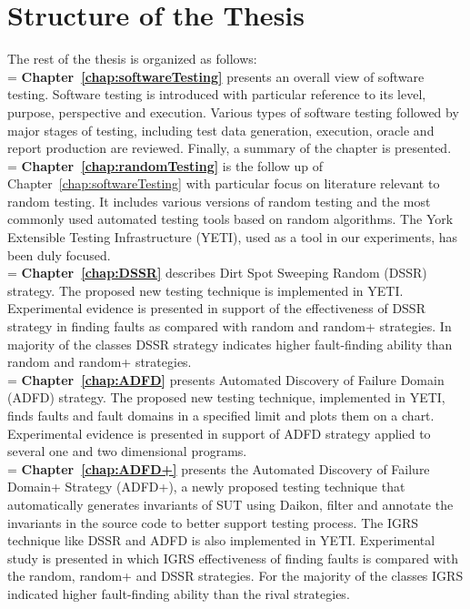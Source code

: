 \section{Structure of the Thesis}
The rest of the thesis is organized as follows:\\

\hangindent=\parindent
{}
\noindent
\textbf{Chapter~\ref{chap:softwareTesting}} presents an overall view of software testing. Software testing is introduced with particular reference to its level, purpose, perspective and execution. Various types of software testing followed by major stages of testing, including test data generation, execution, oracle and report production are reviewed. Finally, a summary of the chapter is presented. \\


\hangindent=\parindent
{}
\noindent
\textbf{Chapter~\ref{chap:randomTesting}} is the follow up of Chapter~\ref{chap:softwareTesting} with particular focus on literature relevant to random testing. It includes various versions of random testing and the most commonly used automated testing tools based on random algorithms. The York Extensible Testing Infrastructure (YETI), used as a tool in our experiments, has been duly focused.\\

\hangindent=\parindent
{}
\noindent
\textbf{Chapter~\ref{chap:DSSR}} describes Dirt Spot Sweeping Random (DSSR) strategy. The proposed new testing technique is implemented in YETI. Experimental evidence is presented in support of the effectiveness of DSSR strategy in finding faults as compared with random and random+ strategies. In majority of the classes DSSR strategy indicates higher fault-finding ability than random and random+ strategies. \\

\hangindent=\parindent
{}
\noindent
\textbf{Chapter~\ref{chap:ADFD}} presents Automated Discovery of Failure Domain (ADFD) strategy. The proposed new testing technique, implemented in YETI, finds faults and fault domains in a specified limit and plots them on a chart. Experimental evidence is presented in support of ADFD strategy applied to several one and two dimensional programs. \\

 
\hangindent=\parindent
{}
\noindent
\textbf{Chapter~\ref{chap:ADFD+}} presents the Automated Discovery of Failure Domain+ Strategy (ADFD+), a newly proposed testing technique that automatically generates invariants of SUT using Daikon, filter and annotate the invariants in the source code to better support testing process. The IGRS technique like DSSR and ADFD is also implemented in YETI. Experimental study is presented in which IGRS effectiveness of finding faults is compared with the random, random+ and DSSR strategies. For the majority of the classes IGRS indicated higher fault-finding ability than the rival strategies.\\

